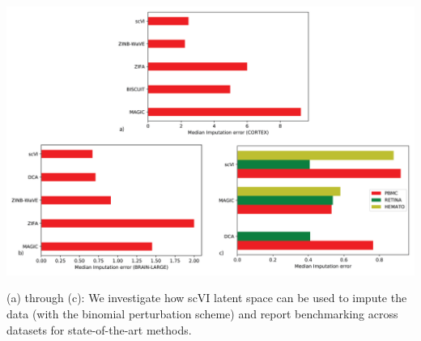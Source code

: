 \begin{suppfigure}[p]
\centering
\includegraphics[width=\textwidth]{figures/loglik_imputation_supplement_non_unif.png}
\caption[Non-uniform imputation benchmarking]{(a) through (c): We investigate how scVI latent space can be used to impute the data (with the binomial perturbation scheme) and report benchmarking across datasets for state-of-the-art methods.}
\label{scvilog_imputation_non_unif_supp}
\end{suppfigure}

